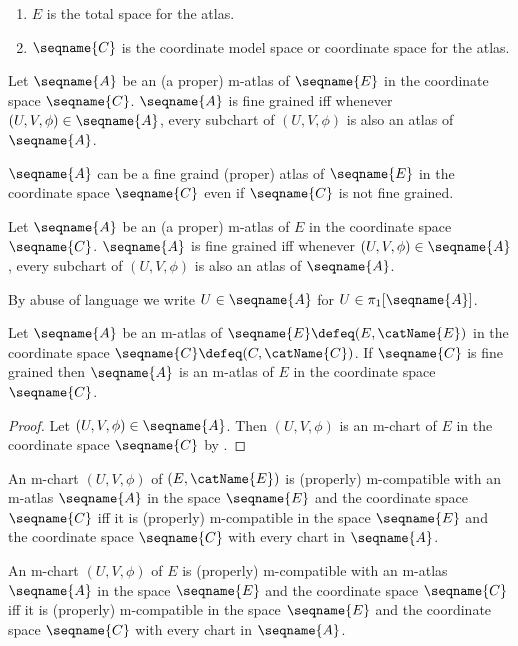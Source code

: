 \documentclass{article}
\begin{document}
\begin{definition}[M-atlases]
\begin{enumerate}[resume]
\item
$E$ is the total space for the atlas.

\item
$\seqname{C}$ is the coordinate model space or coordinate space for the
atlas.
\end{enumerate}

Let $\seqname{A}$ be an (a proper) m-atlas of $\seqname{E}$ in the
coordinate space $\seqname{C}$.  $\seqname{A}$ is fine grained iff
whenever $(U,V,\phi) \in \seqname{A}$, every subchart of
$(U,V,\phi)$ is also an atlas of $\seqname{A}$.

\begin{remark}
$\seqname{A}$ can be a fine graind (proper) atlas of $\seqname{E}$ in
the coordinate space $\seqname{C}$ even if $\seqname{C}$ is not fine
grained.
\end{remark}

Let $\seqname{A}$ be an (a proper) m-atlas of $E$ in the coordinate
space $\seqname{C}$.  $\seqname{A}$ is fine grained iff whenever
$(U,V,\phi) \in \seqname{A}$, every subchart of $(U,V,\phi)$ is also an
atlas of $\seqname{A}$.

By abuse of language we write $U \in \seqname{A}$ for
$U \in \pi_1[\seqname{A}]$.
\end{definition}

\begin{lemma}[M-atlases]
\label{lem:M-atlas}
Let $\seqname{A}$ be an m-atlas of $\seqname{E} \defeq (E, \catName{E})$
in the coordinate space $\seqname{C} \defeq (C,\catName{C})$. If
$\seqname{C}$ is fine grained then $\seqname{A}$ is an m-atlas of $E$ in
the coordinate space $\seqname{C}$.

\begin{proof}
Let $(U,V,\phi) \in \seqname{A}$. Then $(U,V,\phi)$ is an m-chart of $E$
in the coordinate space $\seqname{C}$ by .
\end{proof}
\end{lemma}

\begin{definition}
\label{def:M-CompatATL}
An m-chart $(U, V, \phi)$ of $(E, \catName{E})$ is (properly)
m-compatible with an m-atlas $\seqname{A}$ in the space $\seqname{E}$
and the coordinate space $\seqname{C}$ iff it is (properly) m-compatible
in the space $\seqname{E}$ and the coordinate space $\seqname{C}$
with every chart in $\seqname{A}$.

An m-chart $(U, V, \phi)$ of $E$ is (properly) m-compatible with an
m-atlas $\seqname{A}$ in the space $\seqname{E}$ and the coordinate
space $\seqname{C}$ iff it is (properly) m-compatible in the space
$\seqname{E}$ and the coordinate space $\seqname{C}$ with every chart in
$\seqname{A}$.
\end{definition}
\end{document}
